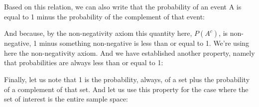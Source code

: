 \documentclass[pdftex, brazil, 12pt, twoside]{article}
\begin{document}
\begin{figure}[H]
  \begin{center}
  \end{center}
\end{figure}

Based on this relation, we can also write that the
probability of an event A is equal to 1 minus the
probability of the complement of that event:

\begin{figure}[H]
  \begin{center}
  \end{center}
\end{figure}

And because, by the non-negativity axiom this
quantity here, $P(A^c)$, is non-negative, 1 minus something non-negative
is less than or equal to 1. We're using here the non-negativity axiom.
And we have established another property, namely that
probabilities are always less than or equal to 1:

\begin{figure}[H]
  \begin{center}
  \end{center}
\end{figure}

Finally, let us note that 1 is the probability, always, of a
set plus the probability of a complement of that set.
And let us use this property for the case where the set of
interest is the entire sample space:

\begin{figure}[H]
  \begin{center}
  \end{center}
\end{figure}
\end{document}

